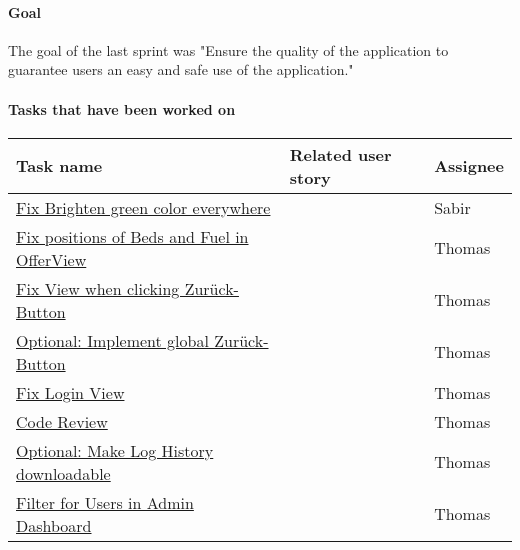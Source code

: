 \paragraph{Goal}
The goal of the last sprint was "Ensure the quality of the application to guarantee users an easy and safe use of the 
application."



\paragraph{Tasks that have been worked on \newline \newline}

\begin{tabular}{|p{}|p{1cm}|p{}|}
    \hline
    {Task name} & {Related user story} & Assignee \\
    \hline
    \hline
	\hline
	\href{https://gitlab.rz.uni-bamberg.de/swt/teaching/2021-ws/swt-swl-b/group-a/-/issues/134}{Fix Brighten green color everywhere} &   & Sabir \\

	\hline
	\href{https://gitlab.rz.uni-bamberg.de/swt/teaching/2021-ws/swt-swl-b/group-a/-/issues/155}{Fix positions of Beds and Fuel in OfferView} &   & Thomas \\

    \hline
	\href{https://gitlab.rz.uni-bamberg.de/swt/teaching/2021-ws/swt-swl-b/group-a/-/issues/151}{Fix View when clicking Zurück-Button} &   & Thomas \\

    \hline
	\href{https://gitlab.rz.uni-bamberg.de/swt/teaching/2021-ws/swt-swl-b/group-a/-/issues/142}{Optional: Implement global Zurück-Button} &   & Thomas \\

    \hline
	\href{https://gitlab.rz.uni-bamberg.de/swt/teaching/2021-ws/swt-swl-b/group-a/-/issues/157}{Fix Login View} &   & Thomas \\

    \hline
	\href{https://gitlab.rz.uni-bamberg.de/swt/teaching/2021-ws/swt-swl-b/group-a/-/issues/95}{Code Review} &   & Thomas \\

    \hline
	\href{https://gitlab.rz.uni-bamberg.de/swt/teaching/2021-ws/swt-swl-b/group-a/-/issues/152}{Optional: Make Log History downloadable} &   & Thomas \\

    \hline
	\href{https://gitlab.rz.uni-bamberg.de/swt/teaching/2021-ws/swt-swl-b/group-a/-/issues/153}{Filter for Users in Admin Dashboard} &   & Thomas \\


\end{tabular}
